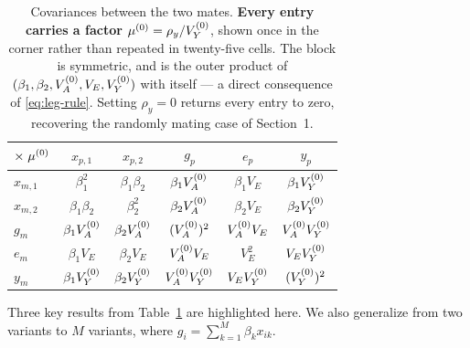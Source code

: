 \documentclass[12pt]{article}
\begin{document}
\begin{table}[H]
    \begin{floatcard}
    \begin{tabular}{l|ccccc}
        $\times \; \mu^{(0)}$ & $x_{p,1}$       & $x_{p,2}$         & $g_p$            & $e_p$          & $y_p$            \\
        \hline
        $x_{m,1}$ & $\beta_1^2$        & $\beta_1\beta_2$   & $\beta_1V_A^{(0)}$     & $\beta_1 V_E$   & $\beta_1V_Y^{(0)}$     \\
        $x_{m,2}$ & $\beta_1\beta_2$   & $\beta_2^2$        & $\beta_2V_A^{(0)}$     & $\beta_2 V_E$   & $\beta_2V_Y^{(0)}$     \\
        $g_m$     & $\beta_1V_A^{(0)}$      & $\beta_2V_A^{(0)}$      & $(V_A^{(0)})^2$        & $V_A^{(0)} V_E$      & $V_A^{(0)}V_Y^{(0)}$        \\
        $e_m$     & $\beta_1 V_E$      & $\beta_2 V_E$      & $V_A^{(0)} V_E$        & $V_E^2$         & $V_EV_Y^{(0)}$         \\
        $y_m$     & $\beta_1V_Y^{(0)}$      & $\beta_2V_Y^{(0)}$      & $V_A^{(0)}V_Y^{(0)}$        & $V_EV_Y^{(0)}$       & $(V_Y^{(0)})^2$        \\
    \end{tabular}
    \caption{%
        Covariances between the two mates. \textbf{Every entry carries a factor $\mu^{(0)} = \rho_y/V_Y^{(0)}$}, shown once in the corner rather than repeated in twenty-five cells.
        The block is symmetric, and is the outer product of $(\beta_1, \beta_2, V_A^{(0)}, V_E, V_Y^{(0)})$ with itself --- a direct consequence of \eqref{eq:leg-rule}.
        Setting $\rho_y = 0$ returns every entry to zero, recovering the randomly mating case of Section~1.%
    }
    \label{tab:pair-2v-between}
    \end{floatcard}
\end{table}

Three key results from Table~\ref{tab:pair-2v-between} are highlighted here.
We also generalize from two variants to $M$ variants, where $g_i = \sum_{k=1}^{M} \beta_k x_{ik}$.
\end{document}
